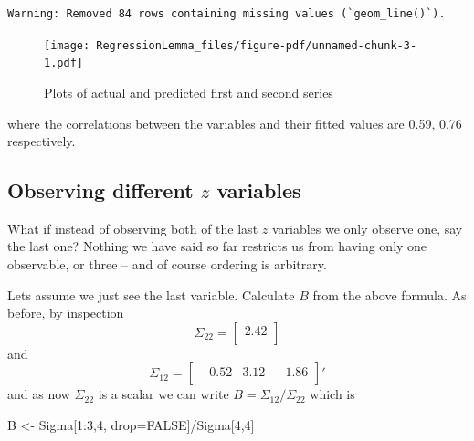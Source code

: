 \documentclass[
  letterpaper,
]{book}
\newenvironment{Shaded}{\begin{snugshade}}{\end{snugshade}}
\newcommand{\ConstantTok}[1]{\textcolor[rgb]{0.56,0.35,0.01}{#1}}
\newcommand{\DecValTok}[1]{\textcolor[rgb]{0.68,0.00,0.00}{#1}}
\newcommand{\NormalTok}[1]{\textcolor[rgb]{0.00,0.23,0.31}{#1}}
\newcommand{\OtherTok}[1]{\textcolor[rgb]{0.00,0.23,0.31}{#1}}
\newcommand{\SpecialCharTok}[1]{\textcolor[rgb]{0.37,0.37,0.37}{#1}}
\begin{document}
\begin{verbatim}
Warning: Removed 84 rows containing missing values (`geom_line()`).
\end{verbatim}

\begin{figure}[H]

{\centering \texttt{[image: RegressionLemma\_files/figure-pdf/unnamed-chunk-3-1.pdf]}

}

\caption{Plots of actual and predicted first and second series}

\end{figure}

where the correlations between the variables and their fitted values are
0.59, 0.76 respectively.

\hypertarget{observing-different-z-variables}{%
\subsection{\texorpdfstring{Observing different \(z\)
variables}{Observing different z variables}}\label{observing-different-z-variables}}

What if instead of observing both of the last \(z\) variables we only
observe one, say the last one? Nothing we have said so far restricts us
from having only one observable, or three -- and of course ordering is
arbitrary.

Lets assume we just see the last variable. Calculate \(B\) from the
above formula. As before, by inspection \[
 \Sigma_{22} = \left[\begin{array}{r}2.42 \\\end{array}\right]
\] and \[
 \Sigma_{12} = \left[\begin{array}{r}-0.52 &3.12 &-1.86 \\\end{array}\right]'
\] and as now \(\Sigma_{22}\) is a scalar we can write
\(B = \Sigma_{12}/\Sigma_{22}\) which is

\begin{Shaded}
\begin{Highlighting}[]
\NormalTok{B }\OtherTok{\textless{}{-}}\NormalTok{ Sigma[}\DecValTok{1}\SpecialCharTok{:}\DecValTok{3}\NormalTok{,}\DecValTok{4}\NormalTok{, drop}\OtherTok{=}\ConstantTok{FALSE}\NormalTok{]}\SpecialCharTok{/}\NormalTok{Sigma[}\DecValTok{4}\NormalTok{,}\DecValTok{4}\NormalTok{]}
\end{Highlighting}
\end{Shaded}
\end{document}
